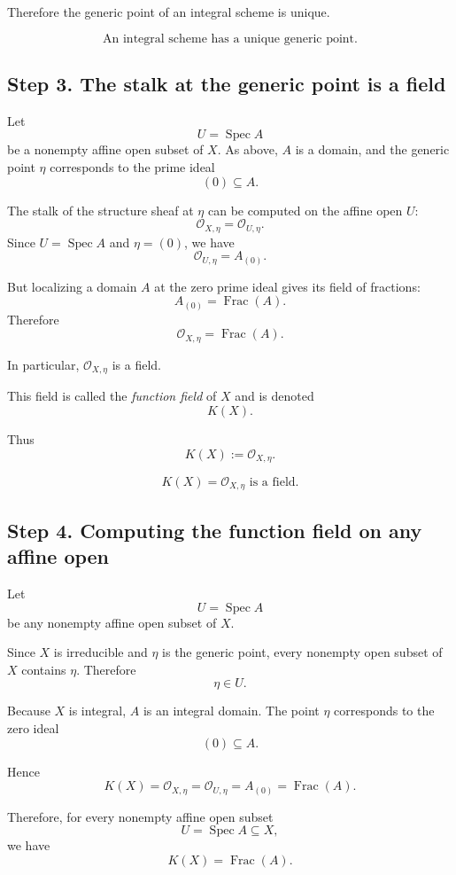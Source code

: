 \documentclass[12pt,a4paper]{article}
\theoremstyle{notespace}
\begin{document}
Therefore the generic point of an integral scheme is unique.

\[
\boxed{
	\text{An integral scheme has a unique generic point.}
}
\]

\subsection*{Step 3. The stalk at the generic point is a field}

Let
\[
U=\operatorname{Spec}A
\]
be a nonempty affine open subset of \(X\). As above, \(A\) is a domain, and the generic point \(\eta\) corresponds to the prime ideal
\[
(0)\subseteq A.
\]

The stalk of the structure sheaf at \(\eta\) can be computed on the affine open \(U\):
\[
\mathcal{O}_{X,\eta}
=
\mathcal{O}_{U,\eta}.
\]
Since \(U=\operatorname{Spec}A\) and \(\eta=(0)\), we have
\[
\mathcal{O}_{U,\eta}
=
A_{(0)}.
\]

But localizing a domain \(A\) at the zero prime ideal gives its field of fractions:
\[
A_{(0)}=\operatorname{Frac}(A).
\]
Therefore
\[
\mathcal{O}_{X,\eta}
=
\operatorname{Frac}(A).
\]

In particular, \(\mathcal{O}_{X,\eta}\) is a field.

This field is called the \emph{function field} of \(X\) and is denoted
\[
K(X).
\]

Thus
\[
K(X):=\mathcal{O}_{X,\eta}.
\]

\[
\boxed{
	K(X)=\mathcal{O}_{X,\eta}
	\text{ is a field.}
}
\]

\subsection*{Step 4. Computing the function field on any affine open}

Let
\[
U=\operatorname{Spec}A
\]
be any nonempty affine open subset of \(X\).

Since \(X\) is irreducible and \(\eta\) is the generic point, every nonempty open subset of \(X\) contains \(\eta\). Therefore
\[
\eta\in U.
\]

Because \(X\) is integral, \(A\) is an integral domain. The point \(\eta\) corresponds to the zero ideal
\[
(0)\subseteq A.
\]

Hence
\[
K(X)
=
\mathcal{O}_{X,\eta}
=
\mathcal{O}_{U,\eta}
=
A_{(0)}
=
\operatorname{Frac}(A).
\]

Therefore, for every nonempty affine open subset
\[
U=\operatorname{Spec}A\subseteq X,
\]
we have
\[
\boxed{
	K(X)=\operatorname{Frac}(A).
}
\]
\end{document}
